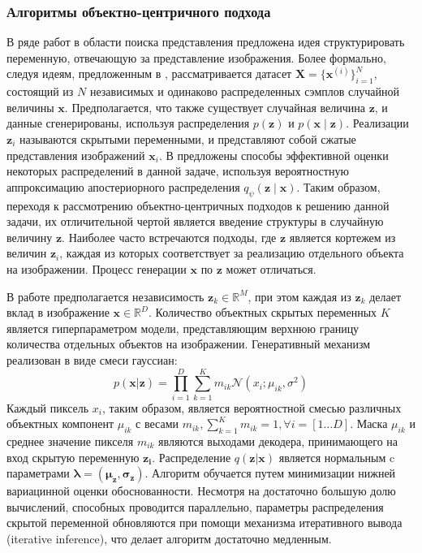 \subsubsection{Алгоритмы объектно-центричного подхода}
В ряде работ в области поиска представления предложена идея структурировать переменную, отвечающую за представление изображения. 
Более формально, следуя идеям, предложенным в \cite{vae}, рассматривается датасет $\mathbf{X}=\{\mathbf{x}^{\left(i \right)}\}_{i=1}^{N}$, состоящий из $N$ независимых и одинаково распределенных сэмплов случайной величины $\mathbf{x}$. 
Предполагается, что также существует случайная величина $\mathbf{z}$, и данные сгенерированы, используя распределения $p\left(\mathbf{z}\right)$ и $p\left(\mathbf{x} \mid \mathbf{z} \right)$. 
Реализации $\mathbf{z}_i$ называются скрытыми переменными, и представляют собой сжатые представления изображений $\mathbf{x}_i$. 
В \cite{vae} предложены способы эффективной оценки некоторых распределений в данной задаче, используя вероятностную аппроксимацию апостериорного распределения $q_{\psi}\left(\mathbf{z} \mid \mathbf{x} \right)$.
Таким образом, переходя к рассмотрению объектно-центричных подходов к решению данной задачи, их отличительной чертой является введение структуры в случайную величину $\mathbf{z}$. 
Наиболее часто встречаются подходы, где $\mathbf{z}$ является кортежем из величин $\mathbf{z}_i$, каждая из которых соответствует за реализацию отдельного объекта на изображении. 
Процесс генерации $\mathbf{x}$ по $\mathbf{z}$ может отличаться.

В работе \cite{IODINE} предполагается независимость $\mathbf{z}_k \in \mathbb{R}^M$, при этом каждая из $\mathbf{z}_k$ делает вклад в изображение $\mathbf{x} \in \mathbb{R}^D$. 
Количество объектных скрытых переменных $K$ является гиперпараметром модели, представляющим верхнюю границу количества отдельных объектов на изображении. 
Генеративный механизм реализован в виде смеси гауссиан: 
\begin{equation}
    p\left(\mathbf{x} | \mathbf{z}\right) = \prod_{i=1}^{D} \sum_{k=1}^{K} m_{ik} \mathcal{N}\left(x_i; \mu_{ik}, \sigma^2 \right)
\end{equation}
Каждый пиксель $x_i$, таким образом, является вероятностной смесью различных объектных компонент $\mu_{ik}$ с весами $m_{ik}, \sum_{k=1}^{K} m_{ik} = 1, \forall i = \left[1 \dots D\right]$. 
Маска $\mu_{ik}$ и среднее значение пикселя $m_{ik}$ являются выходами декодера, принимающего на вход скрытую переменную $\mathbf{z_i}$. 
Распределение $q(\mathbf{z} | \mathbf{x})$ является нормальным c параметрами $\mathbf{\lambda} = \left(\mathbf{\mu}_{\mathbf{z}}, \mathbf{\sigma}_{\mathbf{z}}\right)$. Алгоритм обучается путем минимизации нижней вариацинной оценки обоснованности.
Несмотря на достаточно большую долю вычислений, способных проводится параллельно, параметры распределения скрытой переменной обновляются при помощи механизма итеративного вывода (iterative inference), что делает алгоритм достаточно медленным.

